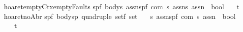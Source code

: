 \begin{isabellebody}
\isanewline
{\isachardoublequoteopen}{\isacharunderscore}hoaret{\isacharunderscore}emptyCtx{\isacharunderscore}emptyFaults{\isachardoublequoteclose}{\isacharcolon}{\isacharcolon}\isanewline
{\isachardoublequoteopen}{\isacharbrackleft}{\isacharparenleft}{\isacharprime}s{\isacharcomma}{\isacharprime}p{\isacharcomma}{\isacharprime}f{\isacharparenright}\ body{\isacharcomma}{\isacharprime}s\ assn{\isacharcomma}{\isacharparenleft}{\isacharprime}s{\isacharcomma}{\isacharprime}p{\isacharcomma}{\isacharprime}f{\isacharparenright}\ com{\isacharcomma}\ {\isacharprime}s\ assn{\isacharcomma}{\isacharprime}s\ assn{\isacharbrackright}\ {\isacharequal}{\isachargreater}\ bool{\isachardoublequoteclose}\isanewline
\ \ \ {\isacharparenleft}{\isachardoublequoteopen}{\isacharparenleft}{}{\isacharunderscore}{\isacharslash}{\isacharbar}{\isacharminus}t{\isacharparenleft}{\isacharunderscore}{\isacharslash}\ {\isacharparenleft}{\isacharunderscore}{\isacharparenright}{\isacharslash}\ {\isacharunderscore}{\isacharcomma}{\isacharslash}{\isacharunderscore}{\isacharparenright}{\isacharparenright}{\isachardoublequoteclose}\ {\isacharbrackleft}{}{}{\isacharcomma}{}{}{}{}{\isacharcomma}{}{}{\isacharcomma}{}{}{}{}{\isacharcomma}{}{}{}{}{\isacharbrackright}{}{}{\isacharparenright}\isanewline
\isanewline
{\isachardoublequoteopen}{\isacharunderscore}hoaret{\isacharunderscore}noAbr{\isachardoublequoteclose}{\isacharcolon}{\isacharcolon}\isanewline
{\isachardoublequoteopen}{\isacharbrackleft}{\isacharparenleft}{\isacharprime}s{\isacharcomma}{\isacharprime}p{\isacharcomma}{\isacharprime}f{\isacharparenright}\ body{\isacharcomma}{\isacharparenleft}{\isacharprime}s{\isacharcomma}{\isacharprime}p{\isacharparenright}\ quadruple\ set{\isacharcomma}{\isacharprime}f\ set{\isacharcomma}\isanewline
\ \ \ {\isacharprime}s\ assn{\isacharcomma}{\isacharparenleft}{\isacharprime}s{\isacharcomma}{\isacharprime}p{\isacharcomma}{\isacharprime}f{\isacharparenright}\ com{\isacharcomma}\ {\isacharprime}s\ assn{\isacharbrackright}\ {\isacharequal}{\isachargreater}\ bool{\isachardoublequoteclose}\isanewline
\ \ \ {\isacharparenleft}{\isachardoublequoteopen}{\isacharparenleft}{}{\isacharunderscore}{\isacharcomma}{\isacharunderscore}{\isacharslash}{\isacharbar}{\isacharminus}t{\isacharprime}{\isacharslash}{\isacharunderscore}\ {\isacharparenleft}{\isacharunderscore}{\isacharslash}\ {\isacharparenleft}{\isacharunderscore}{\isacharparenright}{\isacharslash}\ {\isacharunderscore}{\isacharparenright}{\isacharparenright}{\isachardoublequoteclose}\ {\isacharbrackleft}{}{}{\isacharcomma}{}{}{\isacharcomma}{}{}{\isacharcomma}{}{}{}{}{\isacharcomma}{}{}{\isacharcomma}{}{}{}{}{\isacharbrackright}{}{}{\isacharparenright}\isanewline

\end{isabellebody}

